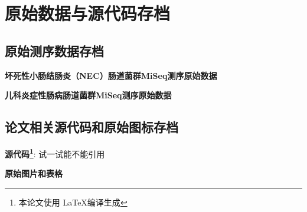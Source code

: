 \chapter{原始数据与源代码存档}

\section{原始测序数据存档}
\textbf{坏死性小肠结肠炎（NEC）肠道菌群MiSeq测序原始数据}

\textbf{儿科炎症性肠病肠道菌群MiSeq测序原始数据}

\section{论文相关源代码和原始图标存档}
\textbf{源代码\footnote{本论文使用 \LaTeX 编译生成}}:
试一试能不能引用\cite{collier2005innate}

\textbf{原始图片和表格}

